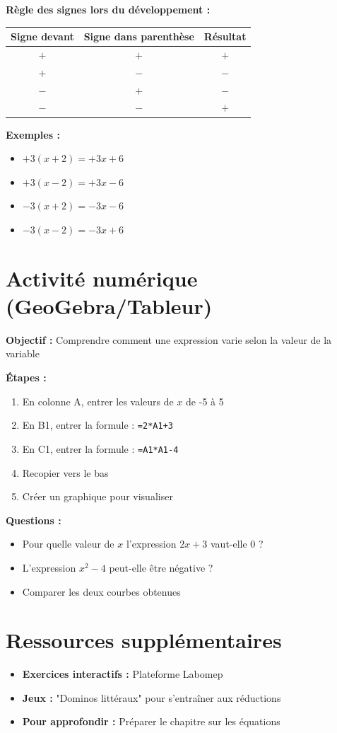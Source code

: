 \begin{methodebox}
	\textbf{Règle des signes lors du développement :}
	
	\begin{center}
		\begin{tabular}{|c|c|c|}
			\hline
			\textbf{Signe devant} & \textbf{Signe dans parenthèse} & \textbf{Résultat} \\
			\hline
			$+$ & $+$ & $+$ \\
			$+$ & $-$ & $-$ \\
			$-$ & $+$ & $-$ \\
			$-$ & $-$ & $+$ \\
			\hline
		\end{tabular}
	\end{center}
	
	\textbf{Exemples :}
	\begin{itemize}
		\item $+3(x + 2) = +3x + 6$
		\item $+3(x - 2) = +3x - 6$
		\item $-3(x + 2) = -3x - 6$
		\item $-3(x - 2) = -3x + 6$
	\end{itemize}
\end{methodebox}

\section{Activité numérique (GeoGebra/Tableur)}

\begin{activitybox}
	\textbf{Objectif :} Comprendre comment une expression varie selon la valeur de la variable
	
	\textbf{Étapes :}
	\begin{enumerate}
		\item En colonne A, entrer les valeurs de $x$ de -5 à 5
		\item En B1, entrer la formule : \texttt{=2*A1+3}
		\item En C1, entrer la formule : \texttt{=A1*A1-4}
		\item Recopier vers le bas
		\item Créer un graphique pour visualiser
	\end{enumerate}
	
	\textbf{Questions :}
	\begin{itemize}
		\item Pour quelle valeur de $x$ l'expression $2x + 3$ vaut-elle 0 ?
		\item L'expression $x^2 - 4$ peut-elle être négative ?
		\item Comparer les deux courbes obtenues
	\end{itemize}
\end{activitybox}

\section*{Ressources supplémentaires}

\begin{itemize}
	\item \textbf{Exercices interactifs :} Plateforme Labomep
	\item \textbf{Jeux :} "Dominos littéraux" pour s'entraîner aux réductions
	\item \textbf{Pour approfondir :} Préparer le chapitre sur les équations
\end{itemize}